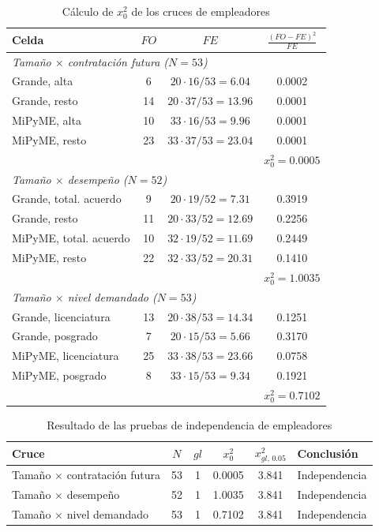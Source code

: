 \documentclass[12pt, a4paper]{article}
\newenvironment{mitabla}[2][H]{%
  \begin{table}[#1]
  \centering
  \caption{#2}
  \small
}{%
  \end{table}
}
\begin{document}
\begin{mitabla}{Cálculo de $x_0^2$ de los cruces de empleadores}\label{tab:a5-chi}
\begin{tabular}{lccc}
\toprule
\textbf{Celda} & \textbf{$FO$} & \textbf{$FE$} & \textbf{$\frac{(FO-FE)^2}{FE}$} \\
\midrule
\multicolumn{4}{l}{\textit{Tamaño $\times$ contratación futura ($N = 53$)}} \\
Grande, alta & 6 & $20 \cdot 16/53 = 6.04$ & 0.0002 \\
Grande, resto & 14 & $20 \cdot 37/53 = 13.96$ & 0.0001 \\
MiPyME, alta & 10 & $33 \cdot 16/53 = 9.96$ & 0.0001 \\
MiPyME, resto & 23 & $33 \cdot 37/53 = 23.04$ & 0.0001 \\
 & & & $x_0^2 = 0.0005$ \\
\midrule
\multicolumn{4}{l}{\textit{Tamaño $\times$ desempeño ($N = 52$)}} \\
Grande, total. acuerdo & 9 & $20 \cdot 19/52 = 7.31$ & 0.3919 \\
Grande, resto & 11 & $20 \cdot 33/52 = 12.69$ & 0.2256 \\
MiPyME, total. acuerdo & 10 & $32 \cdot 19/52 = 11.69$ & 0.2449 \\
MiPyME, resto & 22 & $32 \cdot 33/52 = 20.31$ & 0.1410 \\
 & & & $x_0^2 = 1.0035$ \\
\midrule
\multicolumn{4}{l}{\textit{Tamaño $\times$ nivel demandado ($N = 53$)}} \\
Grande, licenciatura & 13 & $20 \cdot 38/53 = 14.34$ & 0.1251 \\
Grande, posgrado & 7 & $20 \cdot 15/53 = 5.66$ & 0.3170 \\
MiPyME, licenciatura & 25 & $33 \cdot 38/53 = 23.66$ & 0.0758 \\
MiPyME, posgrado & 8 & $33 \cdot 15/53 = 9.34$ & 0.1921 \\
 & & & $x_0^2 = 0.7102$ \\
\bottomrule
\end{tabular}
\end{mitabla}
\begin{mitabla}{Resultado de las pruebas de independencia de empleadores}\label{tab:a5-indep}
\begin{tabular}{lccccl}
\toprule
\textbf{Cruce} & \textbf{$N$} & \textbf{$gl$} & \textbf{$x_0^2$} & \textbf{$x^2_{gl,\,0.05}$} & \textbf{Conclusión} \\
\midrule
Tamaño $\times$ contratación futura & 53 & 1 & 0.0005 & 3.841 & Independencia \\
Tamaño $\times$ desempeño & 52 & 1 & 1.0035 & 3.841 & Independencia \\
Tamaño $\times$ nivel demandado & 53 & 1 & 0.7102 & 3.841 & Independencia \\
\bottomrule
\end{tabular}
\end{mitabla}
\end{document}
